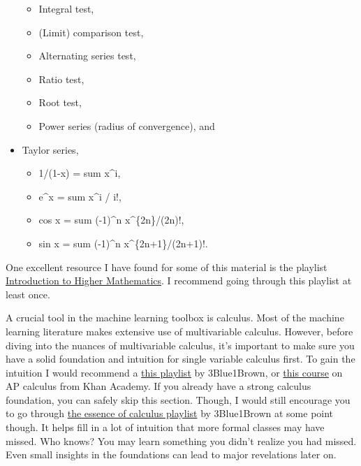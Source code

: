 \begin{itemize}
  \begin{itemize}
  \tightlist
  \item
    Integral test,
  \item
    (Limit) comparison test,
  \item
    Alternating series test,
  \item
    Ratio test,
  \item
    Root test,
  \item
    Power series (radius of convergence), and
  \end{itemize}
\item
  Taylor series,

  \begin{itemize}
  \tightlist
  \item
    1/(1-x) = sum x\^{}i,
  \item
    e\^{}x = sum x\^{}i / i!,
  \item
    cos x = sum (-1)\^{}n x\^{}\{2n\}/(2n)!,
  \item
    sin x = sum (-1)\^{}n x\^{}\{2n+1\}/(2n+1)!.
  \end{itemize}
\end{itemize}

One excellent resource I have found for some of this material is the
playlist
\href{https://youtube.com/playlist?list=PLZzHxk_TPOStgPtqRZ6KzmkUQBQ8TSWVX}{Introduction
to Higher Mathematics}. I recommend going through this playlist at least
once.

A crucial tool in the machine learning toolbox is calculus. Most of the
machine learning literature makes extensive use of multivariable
calculus. However, before diving into the nuances of multivariable
calculus, it's important to make sure you have a solid foundation and
intuition for single variable calculus first. To gain the intuition I
would recommend a
\href{https://www.youtube.com/playlist?list=PLZHQObOWTQDMsr9K-rj53DwVRMYO3t5Yr}{this
playlist} by 3Blue1Brown, or
\href{https://www.khanacademy.org/math/ap-calculus-bc}{this course} on
AP calculus from Khan Academy. If you already have a strong calculus
foundation, you can safely skip this section. Though, I would still
encourage you to go through
\href{https://www.youtube.com/playlist?list=PLZHQObOWTQDMsr9K-rj53DwVRMYO3t5Yr}{the
essence of calculus playlist} by 3Blue1Brown at some point though. It
helps fill in a lot of intuition that more formal classes may have
missed. Who knows? You may learn something you didn't realize you had
missed. Even small insights in the foundations can lead to major
revelations later on.
